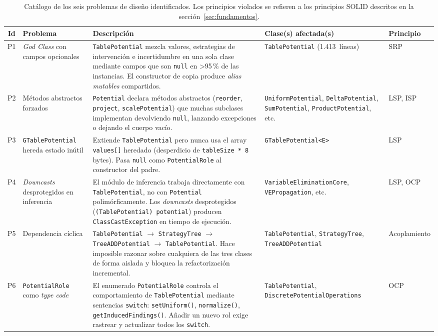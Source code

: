 \documentclass[11pt,a4paper]{article}
\newcommand{\code}[1]{\texttt{#1}}
\begin{document}
\begin{table}[H]
\centering
\small
\setlength{\tabcolsep}{4pt}
\begin{tabular}{clp{5.5cm}p{3.5cm}l}
\toprule
\textbf{Id} & \textbf{Problema} & \textbf{Descripción} & \textbf{Clase(s) afectada(s)} & \textbf{Principio} \\
\midrule
\rowcolor{lightgray}
P1 & \emph{God Class} con campos opcionales &
  \code{TablePotential} mezcla valores, estrategias de intervención e incertidumbre
  en una sola clase mediante campos que son \code{null} en >95\,\% de las instancias.
  El constructor de copia produce \emph{alias mutables} compartidos. &
  \code{TablePotential} (1.413~líneas) &
  SRP \\

P2 & Métodos abstractos forzados &
  \code{Potential} declara métodos abstractos (\code{reorder}, \code{project},
  \code{scalePotential}) que muchas subclases implementan devolviendo \code{null},
  lanzando excepciones o dejando el cuerpo vacío. &
  \code{UniformPotential}, \code{DeltaPotential}, \code{SumPotential}, \code{ProductPotential}, etc. &
  LSP, ISP \\

\rowcolor{lightgray}
P3 & \code{GTablePotential} hereda estado inútil &
  Extiende \code{TablePotential} pero nunca usa el array \code{values[]} heredado
  (desperdicio de \code{tableSize * 8} bytes).  Pasa \code{null} como
  \code{PotentialRole} al constructor del padre. &
  \code{GTablePotential<E>} &
  LSP \\

P4 & \emph{Downcasts} desprotegidos en inferencia &
  El módulo de inferencia trabaja directamente con \code{TablePotential}, no con
  \code{Potential} polimórficamente.  Los \emph{downcasts} desprotegidos
  (\code{(TablePotential) potential}) producen \code{ClassCastException} en
  tiempo de ejecución. &
  \code{VariableEliminationCore}, \code{VEPropagation}, etc. &
  LSP, OCP \\

\rowcolor{lightgray}
P5 & Dependencia cíclica &
  \code{TablePotential} $\to$ \code{StrategyTree} $\to$ \code{TreeADDPotential}
  $\to$ \code{TablePotential}.  Hace imposible razonar sobre cualquiera de las
  tres clases de forma aislada y bloquea la refactorización incremental. &
  \code{TablePotential}, \code{StrategyTree}, \code{TreeADDPotential} &
  Acoplamiento \\

P6 & \code{PotentialRole} como \emph{type code} &
  El enumerado \code{PotentialRole} controla el comportamiento de
  \code{TablePotential} mediante sentencias \code{switch}: \code{setUniform()},
  \code{normalize()}, \code{getInducedFindings()}.  Añadir un nuevo rol exige
  rastrear y actualizar todos los \code{switch}. &
  \code{TablePotential}, \code{DiscretePotentialOperations} &
  OCP \\
\bottomrule
\end{tabular}
\caption{Catálogo de los seis problemas de diseño identificados.  Los principios
         violados se refieren a los principios SOLID descritos en la
         sección~\ref{sec:fundamentos}.}
\label{tab:catalogo-problemas}
\end{table}
\end{document}
